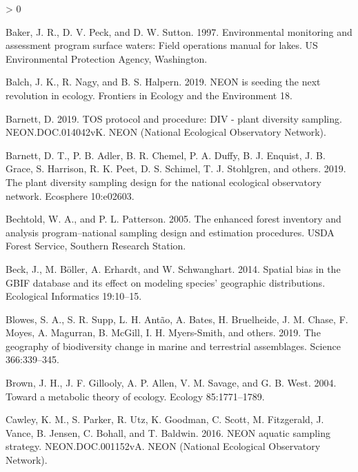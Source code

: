 \documentclass[
  12pt,
]{article}
\newlength{\cslhangindent}
\newenvironment{CSLReferences}[2] %
 {%
  \setlength{\parindent}{0pt}
  \ifodd #1 \everypar{\setlength{\hangindent}{\cslhangindent}}\ignorespaces\fi
  \ifnum #2 > 0
  \setlength{\parskip}{#2\baselineskip}
  \fi
 }%
 {}
\begin{document}
\hypertarget{refs}{}
\begin{CSLReferences}{1}{0}
\leavevmode\hypertarget{ref-baker1997environmental}{}%
Baker, J. R., D. V. Peck, and D. W. Sutton. 1997. Environmental monitoring and assessment program surface waters: Field operations manual for lakes. US Environmental Protection Agency, Washington.

\leavevmode\hypertarget{ref-balch2019neon}{}%
Balch, J. K., R. Nagy, and B. S. Halpern. 2019. NEON is seeding the next revolution in ecology. Frontiers in Ecology and the Environment 18.

\leavevmode\hypertarget{ref-Barnett2019}{}%
Barnett, D. 2019. TOS protocol and procedure: DIV - plant diversity sampling. NEON.DOC.014042vK. NEON (National Ecological Observatory Network).

\leavevmode\hypertarget{ref-barnett2019plant}{}%
Barnett, D. T., P. B. Adler, B. R. Chemel, P. A. Duffy, B. J. Enquist, J. B. Grace, S. Harrison, R. K. Peet, D. S. Schimel, T. J. Stohlgren, and others. 2019. The plant diversity sampling design for the national ecological observatory network. Ecosphere 10:e02603.

\leavevmode\hypertarget{ref-bechtold2005enhanced}{}%
Bechtold, W. A., and P. L. Patterson. 2005. The enhanced forest inventory and analysis program--national sampling design and estimation procedures. USDA Forest Service, Southern Research Station.

\leavevmode\hypertarget{ref-beck2014spatial}{}%
Beck, J., M. Böller, A. Erhardt, and W. Schwanghart. 2014. Spatial bias in the GBIF database and its effect on modeling species' geographic distributions. Ecological Informatics 19:10--15.

\leavevmode\hypertarget{ref-blowes2019geography}{}%
Blowes, S. A., S. R. Supp, L. H. Antão, A. Bates, H. Bruelheide, J. M. Chase, F. Moyes, A. Magurran, B. McGill, I. H. Myers-Smith, and others. 2019. The geography of biodiversity change in marine and terrestrial assemblages. Science 366:339--345.

\leavevmode\hypertarget{ref-brown2004toward}{}%
Brown, J. H., J. F. Gillooly, A. P. Allen, V. M. Savage, and G. B. West. 2004. Toward a metabolic theory of ecology. Ecology 85:1771--1789.

\leavevmode\hypertarget{ref-Cawley2016}{}%
Cawley, K. M., S. Parker, R. Utz, K. Goodman, C. Scott, M. Fitzgerald, J. Vance, B. Jensen, C. Bohall, and T. Baldwin. 2016. NEON aquatic sampling strategy. NEON.DOC.001152vA. NEON (National Ecological Observatory Network).


\end{CSLReferences}
\end{document}
